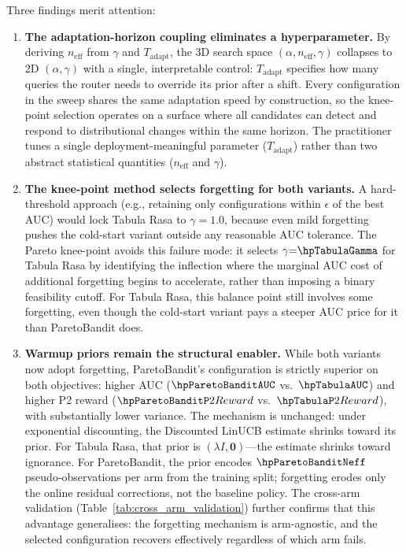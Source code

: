 Three findings merit attention:

\begin{enumerate}[nosep,leftmargin=*]
  \item \textbf{The adaptation-horizon coupling eliminates a
    hyperparameter.}
    By deriving $n_{\text{eff}}$ from $\gamma$ and $T_{\text{adapt}}$, the 3D search
    space $(\alpha, n_{\text{eff}}, \gamma)$ collapses to 2D
    $(\alpha, \gamma)$ with a single, interpretable control:
    $T_{\text{adapt}}$ specifies how many queries the router needs to
    override its prior after a shift.
    Every configuration in the sweep shares the same adaptation
    speed by construction, so the knee-point selection operates on
    a surface where all candidates can detect and respond to
    distributional changes within the same horizon.
    The practitioner tunes a single deployment-meaningful parameter
    ($T_{\text{adapt}}$) rather than two abstract statistical quantities
    ($n_{\text{eff}}$ and $\gamma$).

  \item \textbf{The knee-point method selects forgetting for both
    variants.}
    A hard-threshold approach (e.g., retaining only configurations
    within $\epsilon$ of the best AUC) would lock Tabula Rasa to
    $\gamma{=}1.0$, because even mild forgetting pushes the
    cold-start variant outside any reasonable AUC tolerance.
    The Pareto knee-point avoids this failure mode:
    it selects $\gamma{=}\hpTabulaGamma$ for Tabula Rasa by
    identifying the inflection where the marginal AUC cost of
    additional forgetting begins to accelerate, rather than
    imposing a binary feasibility cutoff.
    For Tabula Rasa, this balance point still involves some
    forgetting, even though the cold-start variant pays a steeper
    AUC price for it than ParetoBandit does.

  \item \textbf{Warmup priors remain the structural enabler.}
    While both variants now adopt forgetting, ParetoBandit's
    configuration is strictly superior on both objectives:
    higher AUC ($\hpParetoBanditAUC$ vs.\ $\hpTabulaAUC$) and
    higher P2 reward ($\hpParetoBanditP2Reward$ vs.\
    $\hpTabulaP2Reward$), with substantially lower variance.
    The mechanism is unchanged: under exponential discounting, the
    Discounted LinUCB estimate shrinks toward its prior.
    For Tabula Rasa, that prior is $(\lambda I, \mathbf{0})$---the
    estimate shrinks toward ignorance.
    For ParetoBandit, the prior encodes $\hpParetoBanditNeff$
    pseudo-observations per arm from the training split; forgetting
    erodes only the online residual corrections, not the baseline
    policy.
    The cross-arm validation (Table~\ref{tab:cross_arm_validation})
    further confirms that this advantage generalises: the
    forgetting mechanism is arm-agnostic, and the selected
    configuration recovers effectively regardless of which arm
    fails.
\end{enumerate}

